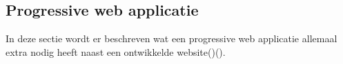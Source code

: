 \chapter{}
\label{ch:stand-van-zaken}





\section{Progressive web applicatie}
In deze sectie wordt er beschreven wat een progressive web applicatie allemaal extra nodig heeft naast een ontwikkelde website(\cite{PWA_EXTRA_FEATURES})(\cite{PWA_EXTRA_FEATURES_2}).

